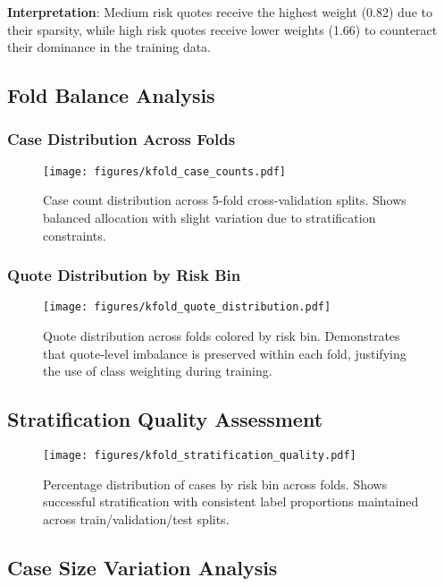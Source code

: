 \documentclass[11pt]{article}
\begin{document}
\textbf{Interpretation}: Medium risk quotes receive the highest weight (0.82) due to their sparsity, while high risk quotes receive lower weights (1.66) to counteract their dominance in the training data.

\subsection{Fold Balance Analysis}

\subsubsection{Case Distribution Across Folds}

\begin{figure}[H]
\centering
\texttt{[image: figures/kfold\_case\_counts.pdf]}
\caption{Case count distribution across 5-fold cross-validation splits. Shows balanced allocation with slight variation due to stratification constraints.}
\end{figure}

\subsubsection{Quote Distribution by Risk Bin}

\begin{figure}[H]
\centering
\texttt{[image: figures/kfold\_quote\_distribution.pdf]}
\caption{Quote distribution across folds colored by risk bin. Demonstrates that quote-level imbalance is preserved within each fold, justifying the use of class weighting during training.}
\end{figure}

\subsection{Stratification Quality Assessment}

\begin{figure}[H]
\centering
\texttt{[image: figures/kfold\_stratification\_quality.pdf]}
\caption{Percentage distribution of cases by risk bin across folds. Shows successful stratification with consistent label proportions maintained across train/validation/test splits.}
\end{figure}

\subsection{Case Size Variation Analysis}
\end{document}

